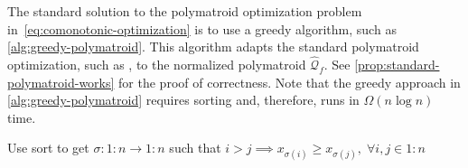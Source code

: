 \documentclass[10pt]{article} %
\DeclareMathOperator*{\argmin}{arg\,min}
\begin{document}
The standard solution to the polymatroid optimization problem in~\eqref{eq:comonotonic-optimization} is to use a greedy algorithm, such as \cref{alg:greedy-polymatroid}. This algorithm adapts the standard polymatroid optimization, such as \citet[section~14.9]{Korte2012}, to the normalized polymatroid $\widehat{\mathcal{Q}}_f$. See \cref{prop:standard-polymatroid-works} for the proof of correctness. Note that the greedy approach in \cref{alg:greedy-polymatroid} requires sorting and, therefore, runs in $\Omega(n \log  n)$ time.

\begin{algorithm}
    \caption{Polymatroid greedy minimization.} \label{alg:greedy-polymatroid}
    \Output{$\hat{\bm{q}} \in \argmin_{\bm{q}\in \widehat{\mathcal{Q}}_f} \bm{x}\tr \bm{q}$}
    Use sort to get
    $\sigma \colon 1{:}n \to 1{:}n$ such that
    $i > j \implies x_{\sigma(i)} \ge  x_{\sigma(j)}, \; \forall i, j \in 1{:}n$\;
\end{algorithm}
\end{document}
